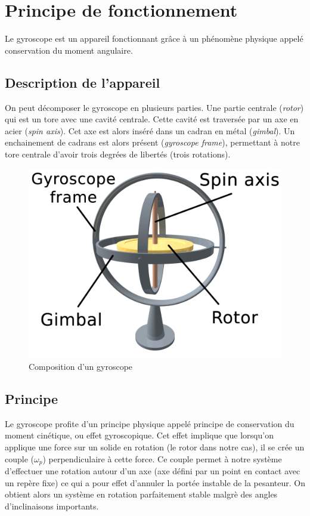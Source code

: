 \documentclass[a4paper,10pt]{report}
\begin{document}
      \section{Principe de fonctionnement}
	Le gyroscope est un appareil fonctionnant grâce à un phénomène physique 
appelé conservation du moment angulaire.
      
	\subsection{Description de l'appareil}
	  On peut décomposer le gyroscope en plusieurs parties. Une partie 
centrale (\textit{rotor}) qui est un tore avec une cavité centrale. Cette 
cavité est traversée par un axe en acier (\textit{spin axis}). Cet axe est 
alors inséré dans un cadran en métal (\textit{gimbal}). Un enchainement de 
cadrans est alors présent (\textit{gyroscope frame}), permettant à notre tore 
centrale d'avoir trois degrées de libertés (trois rotations).

	  \begin{figure}[htbp]
	    \centering
	    \includegraphics[scale = 0.1]{img/3D_Gyroscope.png}
	    \caption{Composition d'un gyroscope}
	    \label{compositiongyroscope}
	  \end{figure}
	  
	\subsection{Principe}
	  Le gyroscope profite d'un principe physique appelé principe de 
conservation du moment cinétique, ou effet gyroscopique. Cet effet implique que 
lorsqu'on applique une force sur un solide en rotation (le rotor dans notre 
cas), il se crée un couple ($\omega_{p}$) perpendiculaire à cette force. Ce 
couple permet à notre système d'effectuer une rotation autour d'un axe (axe 
défini par un point en contact avec un repère fixe) ce qui a pour effet 
d'annuler la portée instable de la pesanteur. On obtient alors un système en 
rotation parfaitement stable malgrè des angles d'inclinaisons importants.
\end{document}
